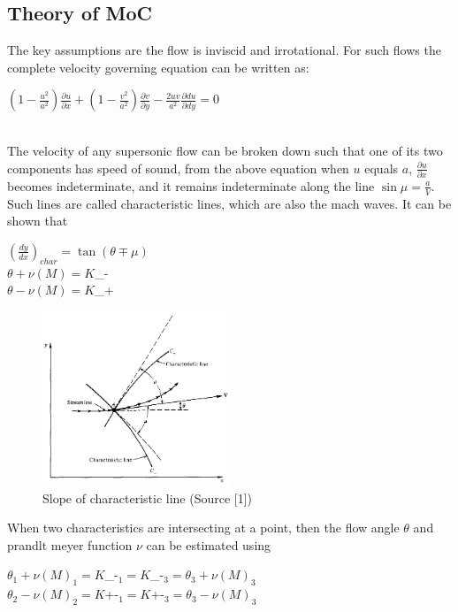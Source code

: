 \subsection{Theory of MoC}
The key assumptions are the flow is inviscid and irrotational. For such flows the complete velocity governing equation can be written as:\\
\begin{center}
    $ (1 - \frac{u^2}{a^2})\frac{\partial u}{\partial x} + (1 - \frac{v^2}{a^2})\frac{\partial v } {\partial y } - \frac{2uv}{a^2}\frac{\partial du}{\partial dy} = 0$
\end{center}\\
The velocity of any supersonic flow can be broken down such that one of its two components has speed of sound, from the above equation when $u$ equals $a$, $\frac{\partial u}{\partial x}$ becomes indeterminate, and it remains indeterminate along the line $\sin{\mu} = \frac{a}{V}$. Such lines are called characteristic lines, which are also the mach waves. It can be shown that
\begin{center}
    $ (\frac{dy}{dx})_{char} = \tan(\theta \mp \mu) $\\
    $  \theta + \nu(M) = K$_-$  $\\
    $  \theta - \nu(M) = K$_+$  $\\
\end{center}
\begin{figure}[H]
    \centering
    \includegraphics[width=0.5\textwidth]{text/Characteristic lines.PNG}
    \caption[Characteristic line]{Slope of characteristic line (Source [1])}
    \label{fig:Slope of characteristic line}
\end{figure}
When two characteristics are intersecting at a point, then the flow angle $\theta$ and prandlt meyer function $\nu$ can be estimated using\\
\begin{center}
    $  \theta_1 + \nu(M)_1 = K$_-$_1 = K$_-$_3 = \theta_3 + \nu(M)_3 $\\ 
    $  \theta_2 - \nu(M)_2 = K$+-$_1 = K$+-$_3 = \theta_3 - \nu(M)_3 $\\ 
    \end{center}
